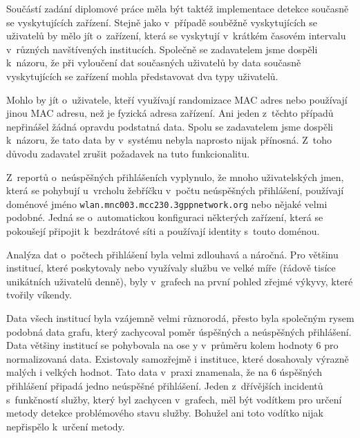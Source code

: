 \documentclass[thesis=M,czech]{FITthesis}[2012/06/26]
\begin{document}

      Součástí zadání diplomové práce měla být taktéž implementace detekce
      současně se vyskytujících zařízení.
      Stejně jako v~případě souběžně vyskytujících se uživatelů by mělo jít
      o~zařízení, která se vyskytují v~krátkém časovém intervalu v~různých navštívených institucích.
      Společně se zadavatelem jsme dospěli k~názoru, že při vyloučení dat současných uživatelů
      by data současně vyskytujících se zařízení mohla představovat dva typy uživatelů.

      Mohlo by jít o~uživatele, kteří využívají randomizace MAC adres nebo
      používají jinou MAC adresu, než je fyzická adresa zařízení.
      Ani jeden z~těchto případů nepřinášel žádná opravdu podstatná data.
      Spolu se zadavatelem jsme dospěli k~názoru, že tato data by v~systému nebyla naprosto nijak přínosná.
      Z~toho důvodu zadavatel zrušit požadavek na tuto funkcionalitu.
      
      Z~reportů o~neúspěšných přihlášeních vyplynulo,
      že mnoho uživatelských jmen, 
      která se pohybují u~vrcholu žebříčku v~počtu neúspěšných přihlášení,
      používají doménové jméno \verb|wlan.mnc003.mcc230.3gppnetwork.org| nebo nějaké velmi podobné.
      Jedná se o~automatickou konfiguraci některých zařízení, 
      která se pokoušejí připojit k~bezdrátové síti a používají identity s~touto doménou.

      Analýza dat o~počtech přihlášení byla velmi zdlouhavá a náročná.
      Pro většinu institucí, které poskytovaly nebo využívaly službu ve velké
      míře (řádově tisíce unikátních uživatelů denně),
      byly v~grafech na první pohled zřejmé výkyvy, které tvořily víkendy.
      
      Data všech institucí byla vzájemně velmi různorodá,
      přesto byla společným rysem podobná data grafu, který
      zachycoval poměr úspěšných a neúspěšných přihlášení.
      Data většiny institucí se pohybovala na ose y v~průměru kolem hodnoty 6 pro normalizovaná data.
      Existovaly samozřejmě i instituce, které dosahovaly výrazně malých i velkých hodnot.
      Tato data v~praxi znamenala, že na 6 úspěšných přihlášení připadá jedno neúspěšné přihlášení.
      Jeden z~dřívějších incidentů s~funkčností služby,
      který byl zachycen v~grafech, měl být vodítkem pro určení metody detekce problémového stavu služby.
      Bohužel ani toto vodítko nijak nepřispělo k~určení metody.
\end{document}
